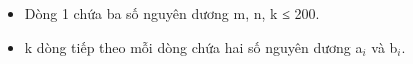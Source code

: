 \begin{itemize}
	\item Dòng 1 chứa ba số nguyên dương m, n, k ≤ 200.
	\item k dòng tiếp theo mỗi dòng chứa hai số nguyên dương a$_i$ và b$_i$.
\end{itemize}